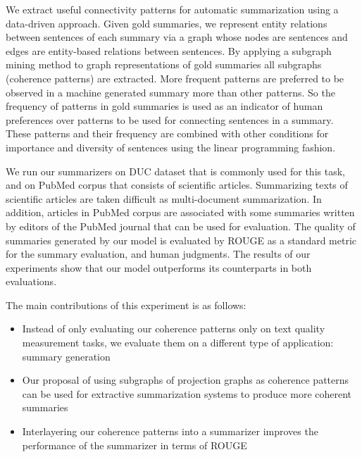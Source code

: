 We extract useful connectivity patterns for automatic summarization using a data-driven approach. 
Given gold summaries, we represent entity relations between sentences of each summary via a graph whose nodes are sentences and edges are entity-based relations between sentences. 
By applying a subgraph mining method to graph representations of gold summaries all subgraphs (coherence patterns) are extracted. 
More frequent patterns are preferred to be observed in a machine generated summary more than other patterns. 
So the frequency of patterns in gold summaries is used as an indicator of human preferences over patterns to be used for connecting sentences in a summary. 
These patterns and their frequency are combined with other conditions for importance and diversity of sentences using the linear programming fashion. 

We run our summarizers on DUC dataset that is commonly used for this task, and on PubMed corpus that consists of scientific articles. 
Summarizing texts of scientific articles are taken difficult as multi-document summarization. 
In addition, articles in PubMed corpus are associated with some summaries written by editors of the PubMed journal that can be used for evaluation. 
The quality of summaries generated by our model is evaluated by ROUGE as a standard metric for the summary evaluation, and human judgments. 
The results of our experiments show that our model outperforms its counterparts in both evaluations.

The main contributions of this experiment is as follows:

\begin{itemize}


	\item Instead of only evaluating our coherence patterns only on text quality measurement tasks, we evaluate them on a different type of application: summary generation

	\item Our proposal of using subgraphs of projection graphs as coherence patterns can be used for extractive summarization systems to produce more coherent summaries

	\item Interlayering our coherence patterns into a summarizer improves the performance of the summarizer in terms of ROUGE


\end{itemize}


